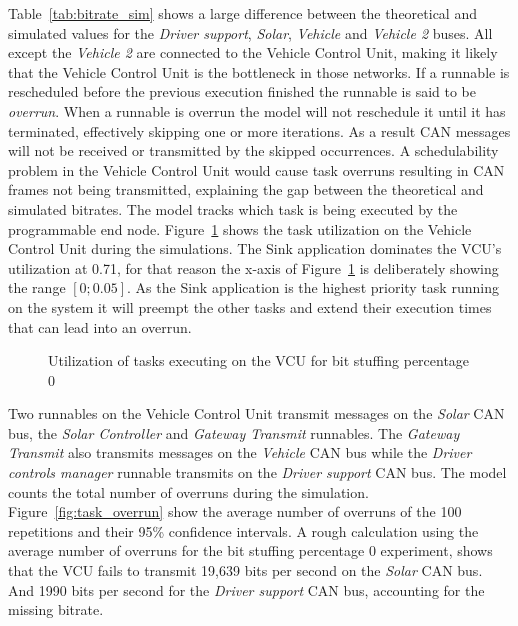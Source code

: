 Table~\ref{tab:bitrate_sim} shows a large difference between the theoretical and simulated values for the \textit{Driver support}, \textit{Solar}, \textit{Vehicle} and \textit{Vehicle 2} buses. All except the \textit{Vehicle 2} are connected to the Vehicle Control Unit, making it likely that the Vehicle Control Unit is the bottleneck in those networks. If a runnable is rescheduled before the previous execution finished the runnable is said to be \textit{overrun}. When a runnable is overrun the model will not reschedule it until it has terminated, effectively skipping one or more iterations. As a result CAN messages will not be received or transmitted by the skipped occurrences. A schedulability problem in the Vehicle Control Unit would cause task overruns resulting in CAN frames not being transmitted, explaining the gap between the theoretical and simulated bitrates. The model tracks which task is being executed by the programmable end node. Figure~\ref{fig:task_util} shows the task utilization on the Vehicle Control Unit during the simulations. The Sink application dominates the VCU's utilization at 0.71, for that reason the x-axis of Figure~\ref{fig:task_util} is deliberately showing the range $[0; 0.05]$. As the Sink application is the highest priority task running on the system it will preempt the other tasks and extend their execution times that can lead into an overrun. 

\begin{figure}[htb]
    \centering
    
    \caption{Utilization of tasks executing on the VCU for bit stuffing percentage 0}
    \label{fig:task_util}
\end{figure}

Two runnables on the Vehicle Control Unit transmit messages on the \textit{Solar} CAN bus, the \textit{Solar Controller} and \textit{Gateway Transmit} runnables. The \textit{Gateway Transmit} also transmits messages on the \textit{Vehicle} CAN bus while the \textit{Driver controls manager} runnable transmits on the \textit{Driver support} CAN bus. The model counts the total number of overruns during the simulation. Figure~\ref{fig:task_overrun} show the average number of overruns of the 100 repetitions and their 95\% confidence intervals. A rough calculation using the average number of overruns for the bit stuffing percentage 0 experiment, shows that the VCU fails to transmit 19,639 bits per second on the \textit{Solar} CAN bus. And 1990 bits per second for the \textit{Driver support} CAN bus, accounting for the missing bitrate. 

